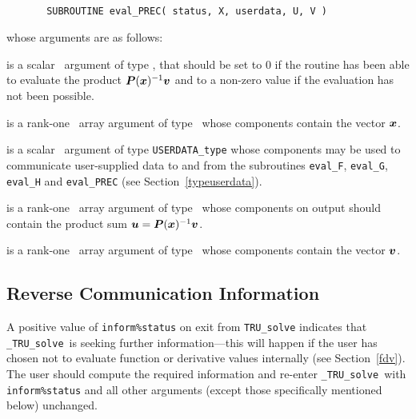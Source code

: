 \documentclass{galahad}
\newcommand{\packagename}{TRU}
\newcommand{\fullpackagename}{\libraryname\_\packagename}
\newcommand{\solver}{{\tt \fullpackagename\_solve}}
\begin{document}
\def\baselinestretch{0.8}
{\tt
\begin{verbatim}
       SUBROUTINE eval_PREC( status, X, userdata, U, V )
\end{verbatim} }
\def\baselinestretch{1.0}
\noindent whose arguments are as follows:

\begin{description}
 is a scalar \intentout\ argument of type \integer,
that should be set to 0 if the routine has been able to evaluate the
product ${\bm{P}}({\bm{x}})^{-1} {\bm{v}}$
and to a non-zero value if the evaluation has not been possible.

 is a rank-one \intentin\ array argument of type \realdp\
whose components contain the vector ${\bm{x}}$.

 is a scalar \intentinout\ argument of type
{\tt USERDATA\_type} whose components may be used
to communicate user-supplied data to and from the
subroutines {\tt eval\_F}, {\tt eval\_G},
{\tt eval\_H} and {\tt eval\_PREC}
(see Section~\ref{typeuserdata}).

 is a rank-one \intentout\ array argument of type \realdp\
whose components on output should contain the product
sum ${\bm{u}} = {\bm{P}}({\bm{x}})^{-1} {\bm{v}}$.

 is a rank-one \intentin\ array argument of type \realdp\
whose components contain the vector ${\bm{v}}$.

\end{description}


\subsection{\label{reverse}Reverse Communication Information}

A positive value of {\tt inform\%status} on exit from
{\tt \packagename\_solve}
indicates that
\solver\ is seeking further information---this will happen
if the user has chosen not to evaluate function or
derivative values internally (see Section~\ref{fdv}).
The user should compute the required information and re-enter \solver\
with {\tt inform\%status} and all other arguments (except those specifically
mentioned below) unchanged.
\end{document}
